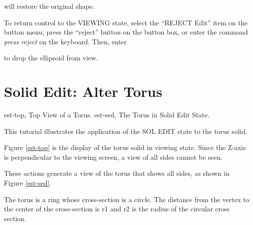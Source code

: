 
will restore the original shape.

To return control to the VIEWING state, select the ``REJECT Edit''
item on the button menu, press the ``reject'' button on the button box,
or enter the command {\em press reject} on the keyboard.
Then, enter


to drop the ellipsoid from view.

\section{Solid Edit: Alter Torus}
\mfig est-top, Top View of a Torus.
\mfig est-sed, The Torus in Solid Edit State.

This tutorial illustrates the application of the SOL EDIT state to the
torus solid.


Figure \ref{est-top} is the display of the torus solid in viewing state.
Since the
Z-axis is perpendicular to the viewing screen, a view of all sides cannot be
seen.


These actions generate a view of the torus that shows all sides,
as shown in Figure \ref{est-sed}.


The torus is a ring whose cross-section is a circle.  The distance from
the vertex to the center of the cross-section is r1 and r2 is the radius of
the circular cross section.

